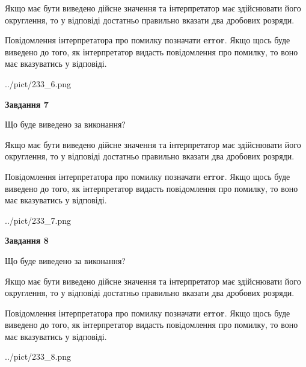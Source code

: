 \documentclass[12pt, ukrainian]{article}
\begin{document}
{\begin {Large}
Якщо має бути виведено дійсне значення та інтерпретатор має здійснювати його округлення, 
то у відповіді достатньо правильно вказати два дробових розряди.

Повідомлення інтерпретатора про помилку позначати \textbf{error}.
Якщо щось буде виведено до того, як інтерпретатор видасть повідомлення про помилку, 
то воно має вказуватись у відповіді. \par

\begin{center}
	{../pict/233_6.png}
\end{center}
\newpage

{\begin {center}\textbf{Завдання 7}\end {center}}\par
Що буде виведено за виконання? \par

Якщо має бути виведено дійсне значення та інтерпретатор має здійснювати його округлення, 
то у відповіді достатньо правильно вказати два дробових розряди.

Повідомлення інтерпретатора про помилку позначати \textbf{error}.
Якщо щось буде виведено до того, як інтерпретатор видасть повідомлення про помилку, 
то воно має вказуватись у відповіді. \par

\begin{center}
	{../pict/233_7.png}
\end{center}
\newpage

{\begin {center}\textbf{Завдання 8}\end {center}}\par
Що буде виведено за виконання? \par

Якщо має бути виведено дійсне значення та інтерпретатор має здійснювати його округлення, 
то у відповіді достатньо правильно вказати два дробових розряди.

Повідомлення інтерпретатора про помилку позначати \textbf{error}.
Якщо щось буде виведено до того, як інтерпретатор видасть повідомлення про помилку, 
то воно має вказуватись у відповіді. \par

\begin{center}
	{../pict/233_8.png}
\end{center}
\newpage


\end{Large}}
\end{document}

